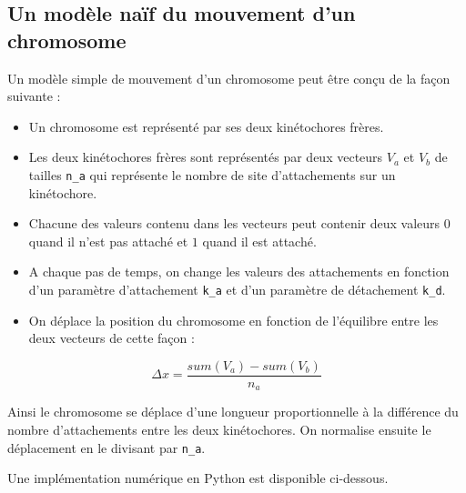 \documentclass[12pt,a4paper,twoside,openright]{book}
\begin{document}
\label{sec:simu-oscillations}

\subsection{Un modèle naïf du mouvement d'un
chromosome}\label{un-moduxe8le-nauxeff-du-mouvement-dun-chromosome}

Un modèle simple de mouvement d'un chromosome peut être conçu de la
façon suivante :

\begin{itemize}
\item
  Un chromosome est représenté par ses deux kinétochores frères.
\item
  Les deux kinétochores frères sont représentés par deux vecteurs
  \(V_a\) et \(V_b\) de tailles \texttt{n\_a} qui représente le nombre
  de site d'attachements sur un kinétochore.
\item
  Chacune des valeurs contenu dans les vecteurs peut contenir deux
  valeurs \(0\) quand il n'est pas attaché et \(1\) quand il est
  attaché.
\item
  A chaque pas de temps, on change les valeurs des attachements en
  fonction d'un paramètre d'attachement \texttt{k\_a} et d'un paramètre
  de détachement \texttt{k\_d}.
\item
  On déplace la position du chromosome en fonction de l'équilibre entre
  les deux vecteurs de cette façon :
\end{itemize}

\[
\Delta x = \frac{sum(V_a) - sum(V_b)}{n_a}
\]

Ainsi le chromosome se déplace d'une longueur proportionnelle à la
différence du nombre d'attachements entre les deux kinétochores. On
normalise ensuite le déplacement en le divisant par \texttt{n\_a}.

Une implémentation numérique en Python est disponible ci-dessous.
\end{document}
